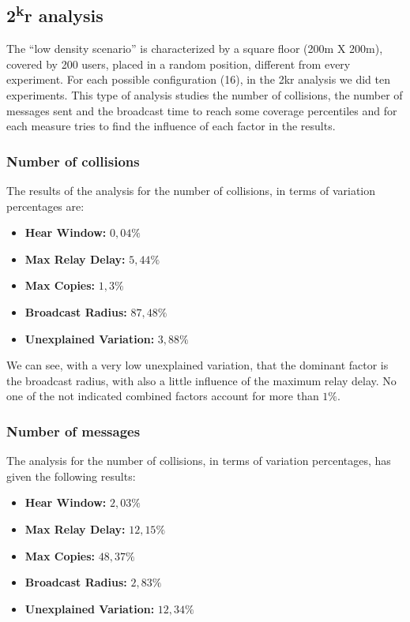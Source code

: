 \subsection{2\texorpdfstring{\textsuperscript{k}}{k}r analysis}\label{subsec:ld2kr}

The ``low density scenario'' is characterized by a square floor (200m X 200m),
covered by 200 users, placed in a random position, different from every
experiment.  For each possible configuration (16), in the 2kr analysis we did
ten experiments. This type of analysis studies the number of collisions, the
number of messages sent and the broadcast time to reach some coverage
percentiles and for each measure tries to find the influence of each factor in
the results.

\subsubsection{Number of collisions}

The results of the analysis for the number of collisions, in terms of variation
percentages are:
\begin{itemize}
	\item \textbf{Hear Window:} \(0,04\%\)
	\item \textbf{Max Relay Delay:} \(5,44\%\)
	\item \textbf{Max Copies:} \(1,3\%\)
	\item \textbf{Broadcast Radius:} \(87,48\%\)
	\item \textbf{Unexplained Variation:} \(3,88\%\)
\end{itemize}

We can see, with a very low unexplained variation, that the dominant factor is
the broadcast radius, with also a little influence of the maximum relay delay.
No one of the not indicated combined factors account for more than \(1\%\).

\subsubsection{Number of messages}

The analysis for the number of collisions, in terms of variation percentages,
has given the following results:
\begin{itemize}
	\item \textbf{Hear Window:} \(2,03\%\)
	\item \textbf{Max Relay Delay:} \(12,15\%\)
	\item \textbf{Max Copies:} \(48,37\%\)
	\item \textbf{Broadcast Radius:} \(2,83\%\)
	\item \textbf{Unexplained Variation:} \(12,34\%\)
\end{itemize}

